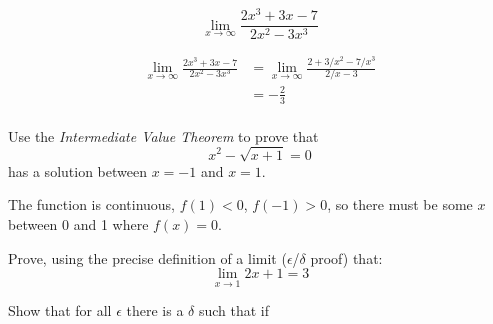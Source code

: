 \documentclass[letterpaper, landscape]{exam}
\begin{document}
\begin{questions}


    \question[8] 
    \label{q:last_limit}
      \[
        \lim_{x \to \infty} \frac{2x^3 + 3x - 7}{2x^2 - 3x^3}
      \]

      \begin{solution}
        \begin{align*}
          \lim_{x \to \infty} \frac{2x^3 + 3x - 7}{2x^2 - 3x^3} 
            & = \lim_{x \to \infty} \frac{2 + 3/x^2 - 7/x^3}{2/x - 3} \\
            & = \boxed{ - \frac{2}{3} } \\
        \end{align*}
      \end{solution}

    \ifprintanswers
      \newpage
    \fi

    \question[5] Use the {\em Intermediate Value Theorem} to prove that 
      \[
        x^2 - \sqrt{x + 1} = 0
      \]
      has a solution between $x = -1$ and $x = 1$.

      \begin{solution}
        The function is continuous, $f(1) < 0$, $f(-1) > 0$, so there must be some $x$ between 0 and
        1 where $f(x) = 0$.
      \end{solution}

    \question[10]
      Prove, using the precise definition of a limit ($\epsilon$/$\delta$ proof) that:
      \[
        \lim_{x \to 1} 2x + 1 = 3
      \]

      \begin{solution}
        Show that for all $\epsilon$ there is a $\delta$ such that if 


\end{solution}
\end{questions}
\end{document}
